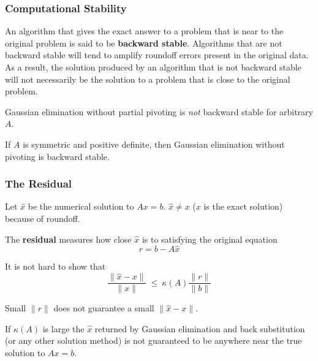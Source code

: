 \documentclass[10pt]{beamer}
\newcommand{\norm}[1]{{\ensuremath{{\|#1\|}}}}
\begin{document}
\begin{frame}
\frametitle{Computational Stability}

An algorithm that gives the exact answer to a problem that is
near to the original problem is said to be \textbf{backward stable}.
Algorithms that are not backward stable will tend to amplify
roundoff errors present in the original data.  As a result, the
solution produced by an algorithm that is not backward stable will
not necessarily be the solution to a problem that is close to the
original problem.

Gaussian elimination without partial pivoting is \emph{not}
backward stable for arbitrary $A$.  

If $A$ is symmetric and positive
definite, then Gaussian elimination without pivoting is backward stable.


\end{frame}
\begin{frame}
\frametitle{The Residual}

Let $\hat{x}$ be the numerical solution to $Ax=b$.
$\hat{x}\neq x$  ($x$ is the exact solution) because of roundoff.

The \textbf{residual} measures how close $\hat{x}$ is to satisfying
the original equation
\begin{equation*}
    r = b - A\hat{x}
\end{equation*}

It is not hard to show that
\begin{equation*}
    \frac{\norm{\hat{x} - x}}{\norm{x}}
       \ \le\ \kappa(A) \frac{\norm{r}}{\norm{b}}
\end{equation*}

Small \norm{r} does not guarantee a small \norm{\hat{x}-x}.

If $\kappa(A)$ is large the $\hat{x}$ returned by Gaussian
elimination and back substitution (or any other solution method) is not
guaranteed to be anywhere near the true solution to $Ax=b$.

\end{frame}
\end{document}
